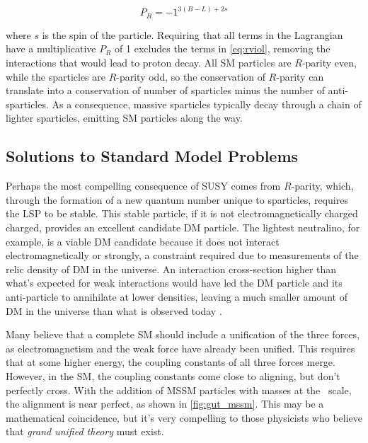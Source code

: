 \begin{equation}
P_R = -1^{3(B-L)+2s}
\end{equation}

where $s$ is the spin of the particle. Requiring that all terms in the Lagrangian have a multiplicative $P_R$ of 1 excludes the terms in \autoref{eq:rviol}, removing the interactions that would lead to proton decay. All \ac{SM} particles are $R$-parity even, while the sparticles are $R$-parity odd, so the conservation of $R$-parity can translate into a conservation of number of sparticles minus the number of anti-sparticles. As a consequence, massive sparticles typically decay through a chain of lighter sparticles, emitting \ac{SM} particles along the way.  

\subsection{Solutions to Standard Model Problems}

Perhaps the most compelling consequence of \ac{SUSY} comes from $R$-parity, which, through the formation of a new quantum number unique to sparticles, requires the \acf{LSP} to be stable. This stable particle, if it is not electromagnetically charged charged, provides an excellent candidate \ac{DM} particle. The lightest neutralino, for example, is a viable \ac{DM} candidate because it does not interact electromagnetically or strongly, a constraint required due to measurements of the relic density of \ac{DM} in the universe. An interaction cross-section higher than what's expected for weak interactions would have led the \ac{DM} particle and its anti-particle to annihilate at lower densities, leaving a much smaller amount of \ac{DM} in the universe than what is observed today \cite{astro-ph/9407006}.

Many believe that a complete \ac{SM} should include a unification of the three forces, as electromagnetism and the weak force have already been unified. This requires that at some higher energy, the coupling constants of all three forces merge. However, in the \ac{SM}, the coupling constants come close to aligning, but don't perfectly cross. With the addition of \ac{MSSM} particles with masses at the \tev~scale, the alignment is near perfect, as shown in \autoref{fig:gut_mssm}. This may be a mathematical coincidence, but it's very compelling to those physicists who believe that \textit{grand unified theory} must exist. 


